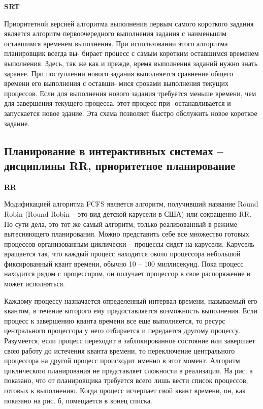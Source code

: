\textbf{SRT}

Приоритетной версией алгоритма выполнения первым самого короткого задания
является алгоритм первоочередного выполнения задания с наименьшим оставшимся
временем выполнения. При использовании этого алгоритма планировщик всегда вы-
бирает процесс с самым коротким оставшимся временем выполнения. Здесь, так же
как и прежде, время выполнения заданий нужно знать заранее. При поступлении
нового задания выполняется сравнение общего времени его выполнения с оставши-
мися сроками выполнения текущих процессов. Если для выполнения нового задания
требуется меньше времени, чем для завершения текущего процесса, этот процесс при-
останавливается и запускается новое здание. Эта схема позволяет быстро обслужить
новое короткое задание.
\newpage
\subsection{Планирование в интерактивных системах – дисциплины RR, приоритетное планирование}

\textbf{RR}

Модификацией алгоритма FCFS является алгоритм, получивший название Round Robin (Round Robin – это вид детской карусели в США) или сокращенно RR. По сути дела, это тот же самый алгоритм, только реализованный в режиме вытесняющего планирования. Можно представить себе все множество готовых процессов организованным циклически – процессы сидят на карусели. Карусель вращается так, что каждый процесс находится около процессора небольшой фиксированный квант времени, обычно 10 – 100 миллисекунд. Пока процесс находится рядом с процессором, он получает процессор в свое распоряжение и может исполняться.

Каждому процессу назначается определенный интервал времени, называемый его квантом, в течение которого ему предоставляется возможность выполнения. Если процесс к завершению кванта времени все еще выполняется, то ресурс центрального процессора у него отбирается и передается другому процессу. Разумеется, если процесс переходит в заблокированное состояние или завершает свою работу до истечения кванта времени, то переключение центрального процессора на другой процесс происходит именно в этот момент. Алгоритм циклического планирования не представляет сложности в реализации. На
рис. а показано, что от планировщика требуется всего лишь вести список процессов, готовых к выполнению. Когда процесс исчерпает свой квант времени, он, как
показано на рис. б, помещается в конец списка.

